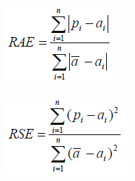 \documentclass[a4paper,12pt, english]{article}
\begin{document}
\begin{enumerate}
\begin{enumerate}
\begin{figure}[h]
         ~ %
        \begin{subfigure}[b]{0.23\textwidth}
                \includegraphics[width=\textwidth]{figs/RAE}
                \label{fig:rae}
        \end{subfigure}\quad
        \begin{subfigure}[b]{0.23\textwidth}
                \includegraphics[width=\textwidth]{figs/RSE}
                \label{fig:rse}
        \end{subfigure}
        

\end{figure}
\end{enumerate}
\end{enumerate}
\end{document}
